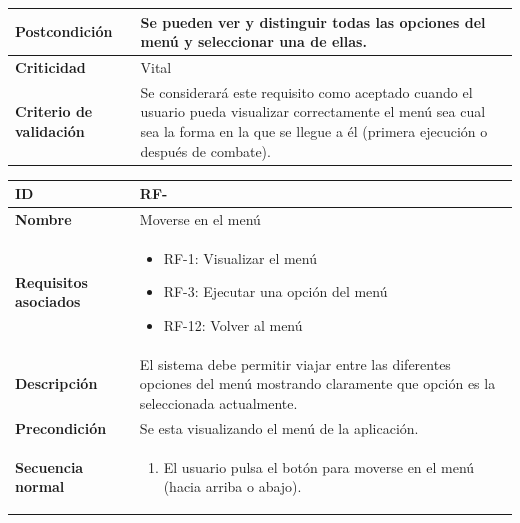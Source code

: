 \begin{center}
\begin{tabular}{ | p{4.7cm} | p{10cm} | }
		\hline
		\textbf{Postcondición} & 
		Se pueden ver y distinguir todas las opciones del menú y seleccionar una de ellas.
		\\
		
		\hline 
		\textbf{Criticidad} &
		Vital\\
		
		\hline 
		\textbf{Criterio de validación} & 
		Se considerará este requisito como aceptado cuando el usuario pueda visualizar correctamente el menú sea cual sea la forma en la que se llegue a él (primera ejecución o después de combate).\\
		
		\hline
	\end{tabular}
\end{center}

\begin{center}
	\begin{tabular}{ | p{4.7cm} | p{10cm} | } 
		\hline
		
		\textbf{ID} & RF-\arabic{contador_requisitos_funcionales}
		{contador_requisitos_funcionales} \\
		
		\hline 
		\textbf{Nombre} &
		Moverse en el menú\\ 
		
		\hline
		\textbf{Requisitos asociados} & 
		\begin{itemize}
			\item RF-1: Visualizar el menú
			\item RF-3: Ejecutar una opción del menú
			\item RF-12: Volver al menú
		\end{itemize}\\
		
		\hline
		\textbf{Descripción} & 
		El sistema debe permitir viajar entre las diferentes opciones del menú mostrando claramente que opción es la seleccionada actualmente.\\
		
		\hline
		\textbf{Precondición} & 
		Se esta visualizando el menú de la aplicación.\\
		
		\hline
		\textbf{Secuencia normal} &
		 \begin{enumerate}
		 	\item El usuario pulsa el botón para moverse en el menú (hacia arriba o abajo).
		 \end{enumerate}
		\\
		

\end{tabular}
\end{center}

